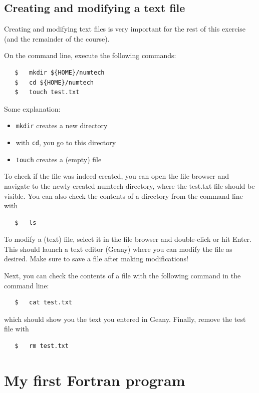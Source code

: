 \documentclass[a4paper]{article}
\begin{document}
\subsection{Creating and modifying a text file}
%
\par
Creating and modifying text files is very important for the rest of this exercise (and the remainder of the course).
%
\par
On the command line, execute the following commands:
%
\begin{verbatim}
   $   mkdir ${HOME}/numtech
   $   cd ${HOME}/numtech
   $   touch test.txt
\end{verbatim}
%
Some explanation:
%
\begin{itemize}
	\item \texttt{mkdir} creates a new directory
	\item with \texttt{cd}, you go to this directory
	\item \texttt{touch} creates a (empty) file
\end{itemize}
%
To check if the file was indeed created, you can open the file browser and navigate to the newly created numtech directory, where the test.txt file should be visible. You can also check the contents of a directory from the command line with
%
\begin{verbatim}
   $   ls
\end{verbatim}
%
To modify a (text) file, select it in the file browser and double-click or hit Enter. This should launch a text editor (Geany) where you can modify the file as desired. Make sure to save a file after making modifications!
%
\par
Next, you can check the contents of a file with the following command in the command line:
%
\begin{verbatim}
   $   cat test.txt
\end{verbatim}
%
which should show you the text you entered in Geany. Finally, remove the test file with 
%
\begin{verbatim}
   $   rm test.txt
\end{verbatim}
%
\section{My first Fortran program}
%
\end{document}
